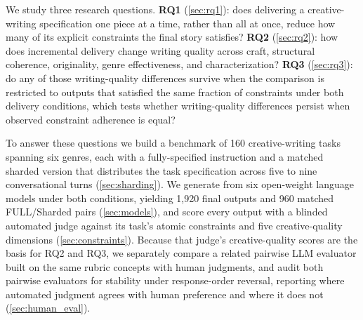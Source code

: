 We study three research questions. \textbf{RQ1} (\cref{sec:rq1}): does delivering a creative-writing specification one piece at a time, rather than all at once, reduce how many of its explicit constraints the final story satisfies? \textbf{RQ2} (\cref{sec:rq2}): how does incremental delivery change writing quality across craft, structural coherence, originality, genre effectiveness, and characterization? \textbf{RQ3} (\cref{sec:rq3}): do any of those writing-quality differences survive when the comparison is restricted to outputs that satisfied the same fraction of constraints under both delivery conditions, which tests whether writing-quality differences persist when observed constraint adherence is equal?

To answer these questions we build a benchmark of 160 creative-writing tasks spanning six genres, each with a fully-specified instruction and a matched sharded version that distributes the task specification across five to nine conversational turns (\cref{sec:sharding}). We generate from six open-weight language models under both conditions, yielding 1{,}920 final outputs and 960 matched FULL/Sharded pairs (\cref{sec:models}), and score every output with a blinded automated judge against its task's atomic constraints and five creative-quality dimensions (\cref{sec:constraints}). Because that judge's creative-quality scores are the basis for RQ2 and RQ3, we separately compare a related pairwise LLM evaluator built on the same rubric concepts with human judgments, and audit both pairwise evaluators for stability under response-order reversal, reporting where automated judgment agrees with human preference and where it does not (\cref{sec:human_eval}).


